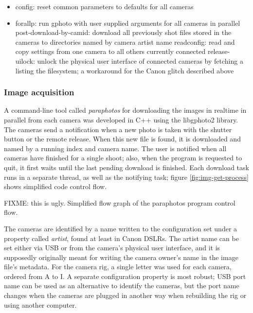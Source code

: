 \begin{itemize}
\item config: reset common parameters to defaults for all cameras
\item forallp: run gphoto with user supplied arguments for all cameras in parallel
post-download-by-camid: download all previously shot files stored in the cameras to directories named by camera artist name
readconfig: read and copy settings from one camera to all others currently connected
release-uilock: unlock the physical user interface of connected cameras by fetching a listing the filesystem; a workaround for the Canon glitch described above
\end{itemize}



\subsubsection{Image acquisition} %

A command-line tool called \emph{paraphotos} for downloading the images in realtime in parallel from each camera was developed in C++ using the libgphoto2 library.
The cameras send a notification when a new photo is taken with the shutter button or the remote release.
When this new file is found, it is downloaded and named by a running index and camera name.
The user is notified when all cameras have finished for a single shoot; also, when the program is requested to quit, it first waits until the last pending download is finished.
Each download task runs in a separate thread, as well as the notifying task; figure \ref{fig:img-get-process} shows simplified code control flow.

{FIXME: this is ugly. Simplified flow graph of the paraphotos program control flow.}

The cameras are identified by a name written to the configuration set under a property called \emph{artist}, found at least in Canon DSLRs.
The artist name can be set either via USB or from the camera's physical user interface, and it is supposedly originally meant for writing the camera owner's name in the image file's metadata.
For the camera rig, a single letter was used for each camera, ordered from A to I.
A separate configuration property is most robust; USB port name can be used as an alternative to identify the cameras, but the port name changes when the cameras are plugged in another way when rebuilding the rig or using another computer.

